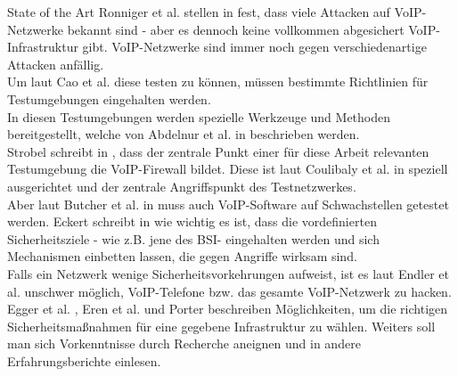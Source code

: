 \begin{section}{State of the Art}
	Ronniger et al. stellen in \cite{Ronniger:2010:robflex} fest, dass viele Attacken auf
	VoIP-Netzwerke bekannt sind - aber es dennoch keine vollkommen abgesichert 
	VoIP-Infrastruktur gibt. VoIP-Netzwerke sind immer noch gegen verschiedenartige Attacken anfällig. \\
	Um laut Cao et al. \cite{CaoWang:2009:DevLab} diese testen zu können, 
	müssen bestimmte Richtlinien für Testumgebungen eingehalten werden. \\
	In diesen Testumgebungen werden spezielle Werkzeuge und Methoden bereitgestellt, 
	welche von Abdelnur et al. in \cite{Abdelnur:2006:voipass} beschrieben werden.  \\
	Strobel schreibt in \cite{strobel:2003:firewalls}, dass der zentrale Punkt einer für diese 
	Arbeit relevanten Testumgebung die VoIP-Firewall bildet. 
	Diese ist laut Coulibaly et al. in \cite{Coulibaly:2010:secvoipb} speziell ausgerichtet 
	und der zentrale Angriffspunkt des Testnetzwerkes. \\
	Aber laut Butcher et al. in  \cite{Butcher:2007:SecChall} muss auch 
	VoIP-Software auf Schwachstellen getestet werden. 
	Eckert schreibt in  \cite{eckert:2009:sicherheit} wie wichtig es ist, 
	dass die vordefinierten Sicherheitsziele - wie z.B. jene des \ac{BSI}- 
	eingehalten werden und sich Mechanismen einbetten lassen, die gegen Angriffe wirksam sind. 
	\\
	
	Falls ein Netzwerk wenige Sicherheitsvorkehrungen aufweist, ist es laut Endler et al. 
	\cite{endler:2006:hacking} unschwer möglich, VoIP-Telefone bzw. das gesamte VoIP-Netzwerk zu hacken.
	 \\
	Egger et al. \cite{Egger:2008:linVoip}, Eren et al. \cite{eren:2007:voip} und 
	Porter \cite{porter:2006:practicalvoip} beschreiben Möglichkeiten, um die richtigen 
	Sicherheitsmaßnahmen für eine gegebene Infrastruktur zu wählen. 
	Weiters soll man sich Vorkenntnisse durch Recherche aneignen und in andere Erfahrungsberichte einlesen. \\
\end{section}
\pagebreak
